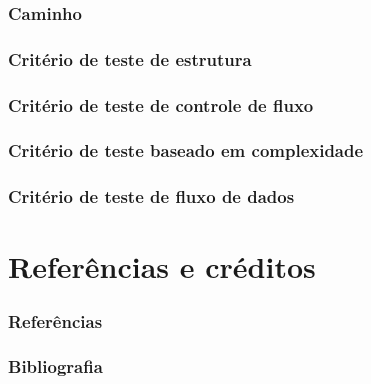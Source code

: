 \documentclass[utf8, usepdftitle=false, svgnames, color={table,
fixpdftex, hyperref, fixinclude, xcdraw}, t, brazil]{beamer}
\begin{document}
 \section{Caminho}
 

 \section{Critério de teste de estrutura}
 
 
 \section{Critério de teste de controle de fluxo}
  
 
 \section{Critério de teste baseado em complexidade}
  

 \section{Critério de teste de fluxo de dados}
   
 
 \part{Referências e créditos}
 
 \section{Referências}
 
 
 \section{Bibliografia}
 
 
%  
\end{document}
